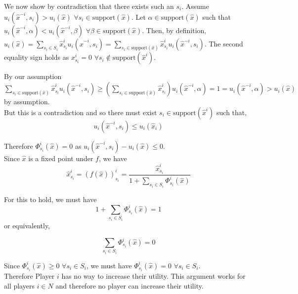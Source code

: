 \documentclass[12pt]{article}
\begin{document}
We now show by contradiction that there exists such an $s_i$. Assume $u_i(\hat{x}^{-i}, s_i) > u_i(\hat{x})$ $\forall s_i \in \text{support}(\hat{x})$. Let $\alpha \in \text{support}(\hat{x})$ such that $u_i(\hat{x}^{-i}, \alpha) < u_i(\hat{x}^{-i}, \beta)$ $\forall \beta \in \text{support}(\hat{x})$. Then, by definition, $u_i(\hat{x}) = \sum\limits_{s_i \in S_i} \hat{x}^i_{s_i} u_i(\hat{x}^{-i},s_i) = \sum\limits_{s_i \in \text{support}(\hat{x})} \hat{x}^i_{s_i} u_i(\hat{x}^{-i},s_i)$. The second equality sign holds as $x^i_{s_i} = 0$ $\forall  s_i \notin \text{support}(\hat{x}^i)$.

By our assumption $\sum\limits_{s_i \in \text{support}(\hat{x})} \hat{x}^i_{s_i} u_i(\hat{x}^{-i},s_i) \geq (\sum\limits_{s_i \in \text{support}(\hat{x})} \hat{x}^i_{s_i})u_i(\hat{x}^{-i}, \alpha) = 1 = u_i(\hat{x}^{-i}, \alpha) > u_i(\hat{x})$ by assumption.\\

But this is a contradiction and so there must exist $s_i \in \text{support}(\hat{x}^i)$ such that,
\begin{equation*}
u_i(\hat{x}^{-i},s_i) \leq u_i(\hat{x}_i)
\end{equation*}

Therefore $\Phi^i_{s_i}(\hat{x}) = 0$ as $u_i(\hat{x}^{-i},s_i) - u_i(\hat{x}) \leq 0$.\\

Since $\hat{x}$ is a fixed point under $f$, we have 
\begin{equation*}
\hat{x}^i_{s_i} = (f(\hat{x}))^i_{s_i} = \dfrac{\hat{x}^i_{s_i}}{1 + \sum\limits_{s_i \in S_i} \Phi^i_{s_i}(\hat{x})}
\end{equation*}
 
For this to hold, we must have
\begin{equation*}
1 + \sum\limits_{s_i \in S_i} \Phi^i_{s_i}(\hat{x}) = 1
\end{equation*}
or equivalently,

\begin{equation*}
\sum\limits_{s_i \in S_i} \Phi^i_{s_i}(\hat{x}) = 0
\end{equation*}

Since $\Phi^i_{s_i}(\hat{x}) \geq 0$ $\forall s_i \in S_i$, we must have $\Phi^i_{s_i}(\hat{x}) = 0$ $\forall s_i \in S_i$.\\

Therefore Player $i$ has no way to increase their utility. This argument works for all players $i \in N$ and therefore no player can increase their utility.
\end{document}
